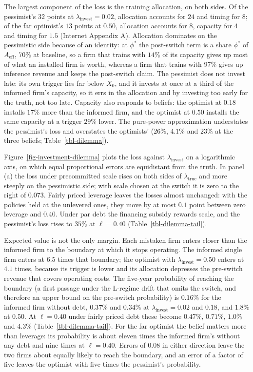 \documentclass[
  11pt,
  letterpaper,
]{scrartcl}
\begin{document}
The largest component of the loss is the training allocation, on both
sides. Of the pessimist's \(32\) points at
\(\lambda_{\text{invest}} = 0.02\), allocation accounts for \(24\) and
timing for \(8\); of the far optimist's \(13\) points at \(0.50\),
allocation accounts for \(8\), capacity for \(4\) and timing for \(1.5\)
(Internet Appendix A). Allocation dominates on the pessimistic side
because of an identity: at \(\phi^*\) the post-switch term is a share
\(\phi^*\) of \(A_{\text{eff}}\), \(70\%\) at baseline, so a firm that
trains with \(14\%\) of its capacity gives up most of what an installed
firm is worth, whereas a firm that trains with \(97\%\) gives up
inference revenue and keeps the post-switch claim. The pessimist does
not invest late: its own trigger lies far below \(X_0\), and it invests
at once at a third of the informed firm's capacity, so it errs in the
allocation and by investing too early for the truth, not too late.
Capacity also responds to beliefs: the optimist at \(0.18\) installs
\(17\%\) more than the informed firm, and the optimist at \(0.50\)
installs the same capacity at a trigger \(29\%\) lower. The pure-power
approximation understates the pessimist's loss and overstates the
optimists' (\(26\%\), \(4.1\%\) and \(23\%\) at the three beliefs;
Table~\ref{tbl-dilemma}).

Figure~\ref{fig-investment-dilemma} plots the loss against
\(\lambda_{\text{invest}}\) on a logarithmic axis, on which equal
proportional errors are equidistant from the truth. In panel (a) the
loss under precommitted scale rises on both sides of
\(\lambda_{\text{true}}\) and more steeply on the pessimistic side; with
scale chosen at the switch it is zero to the right of \(0.073\). Fairly
priced leverage leaves the losses almost unchanged: with the policies
held at the unlevered ones, they move by at most \(0.1\) point between
zero leverage and \(0.40\). Under par debt the financing subsidy rewards
scale, and the pessimist's loss rises to \(35\%\) at \(\ell = 0.40\)
(Table~\ref{tbl-dilemma-tail}).

Expected value is not the only margin. Each mistaken firm enters closer
than the informed firm to the boundary at which it stops operating. The
informed single firm enters at \(6.5\) times that boundary; the optimist
with \(\lambda_{\text{invest}} = 0.50\) enters at \(4.1\) times, because
its trigger is lower and its allocation depresses the pre-switch revenue
that covers operating costs. The five-year probability of reaching the
boundary (a first passage under the L-regime drift that omits the
switch, and therefore an upper bound on the pre-switch probability) is
\(0.16\%\) for the informed firm without debt, \(0.37\%\) and \(0.34\%\)
at \(\lambda_{\text{invest}} = 0.02\) and \(0.18\), and \(1.8\%\) at
\(0.50\). At \(\ell = 0.40\) under fairly priced debt these become
\(0.47\%\), \(0.71\%\), \(1.0\%\) and \(4.3\%\)
(Table~\ref{tbl-dilemma-tail}). For the far optimist the belief matters
more than leverage: its probability is about eleven times the informed
firm's without any debt and nine times at \(\ell = 0.40\). Errors of
\(0.08\) in either direction leave the two firms about equally likely to
reach the boundary, and an error of a factor of five leaves the optimist
with five times the pessimist's probability.
\end{document}
